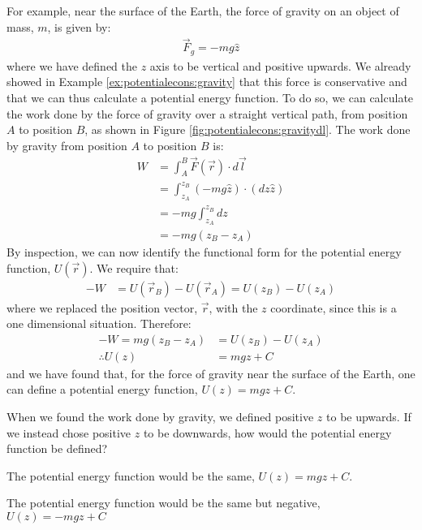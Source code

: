 For example, near the surface of the Earth, the force of gravity on an object of mass, $m$, is given by:
\begin{align*}
\vec F_g = -mg \hat z
\end{align*}
where we have defined the $z$ axis to be vertical and positive upwards. We already showed in Example \ref{ex:potentialecons:gravity} that this force is conservative and that we can thus calculate a potential energy function. To do so, we can calculate the work done by the force of gravity over a straight vertical path, from position $A$ to position $B$, as shown in Figure \ref{fig:potentialecons:gravitydl}.
The work done by gravity from position $A$ to position $B$ is:
\begin{align*}
W &= \int_A^B \vec F(\vec r) \cdot d\vec l\\
&= \int_{z_A}^{z_B} ( -mg \hat z) \cdot (dz \hat z) \\
&= -mg \int_{z_A}^{z_B} dz\\
&= -mg(z_B-z_A) 
\end{align*} 
By inspection, we can now identify the functional form for the potential energy function, $U(\vec r)$. We require that:
\begin{align*}
-W &= U(\vec r_B) - U(\vec r_A) = U(z_B) - U(z_A)
\end{align*}
where we replaced the position vector, $\vec r$, with the $z$ coordinate, since this is a one dimensional situation. Therefore:
\begin{align*}
-W=mg(z_B-z_A)&= U(z_B) - U(z_A)\\
\therefore U(z) &= mgz + C
\end{align*} 
and we have found that, for the force of gravity near the surface of the Earth, one can define a potential energy function, $U(z) = mgz +C$.

\begin{checkpoint}
\begin{MCquestion}{When we found the work done by gravity, we defined positive $z$ to be upwards. If we instead chose positive $z$ to be downwards, how would the potential energy function be defined?}
\item The potential energy function would be the same, $U(z)=mgz+C$.
\item The potential energy function would be the same but negative, $U(z)=-mgz+C$ \correct
\end{MCquestion}
\end{checkpoint}

